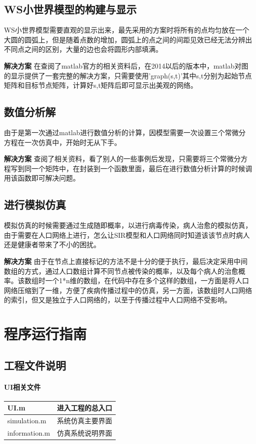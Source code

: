 \documentclass[supercite]{HustGraduPaper}
\begin{document}
	\subsection{WS小世界模型的构建与显示}
	WS小世界模型需要直观的显示出来，最先采用的方案时将所有的点均匀放在一个大圆的圆弧上，但是随着点数的增加，圆弧上的点之间的间距见效已经无法分辨出不同点之间的区别，大量的边也会将圆形内部填满。
	\par
	\textbf{解决方案}
	在查阅了matlab官方的相关资料后，在2014以后的版本中，matlab对图的显示提供了一套完整的解决方案，只需要使用'graph(s,t)'其中s,t分别为起始节点矩阵和目标节点矩阵，计算好s,t矩阵后即可显示出美观的网络。
	
	\subsection{数值分析解}
	由于是第一次通过matlab进行数值分析的计算，因模型需要一次设置三个常微分方程在一次仿真中，开始时无从下手。
	\par
	\textbf{解决方案}
	查阅了相关资料，看了别人的一些事例后发现，只需要将三个常微分方程写到同一个矩阵中，在封装到一个函数里面，最后在进行数值分析计算的时候调用该函数即可解决问题。
	

	\subsection{进行模拟仿真}
	模拟仿真的时候需要通过生成随即概率，以进行病毒传染，病人治愈的模拟仿真，由于需要在人口网络上进行，怎么让SIR模型和人口网络同时知道该该节点时病人还是健康者带来了不小的困扰。
	\par
	\textbf{解决方案}
	由于在节点上直接标记的方法不是十分的便于执行，最后决定采用中间数组的方式，通过人口数组计算不同节点被传染的概率，以及每个病人的治愈概率。该数组时一个1*n维的数组，在代码中存在多个这样的数组，一方面是将人口网络压缩到了一维，方便了疾病传播过程中的仿真，另一方面，该数组时人口网络的索引，但又是独立于人口网络的，以至于传播过程中人口网络不受影响。

	\section{程序运行指南}
	\subsection{工程文件说明}
	\paragraph{UI相关文件}
	\begin{center}
		\begin{tabular}{|m{13em}|m{13em}|}
		\hline
		UI.m & 进入工程的总入口\\
		\hline
		simulation.m & 系统仿真主要界面\\
		\hline
		information.m & 仿真系统说明界面\\
		\hline
		\end{tabular}
	\end{center}
\end{document}
